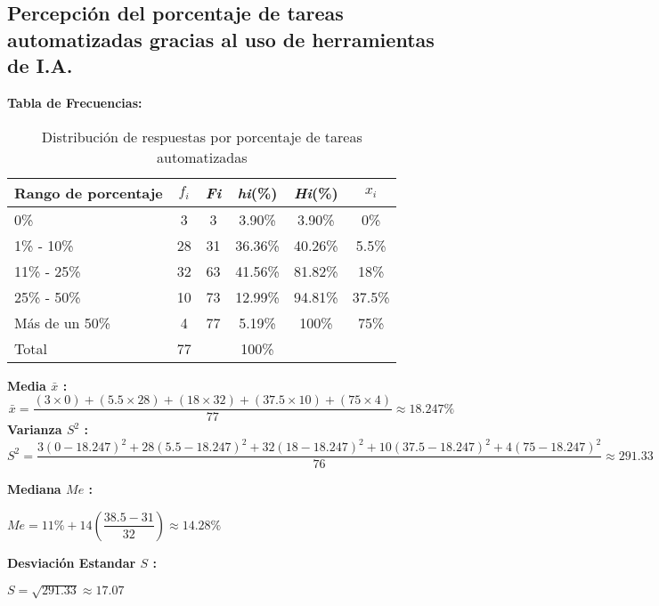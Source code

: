 \subsection{Percepción del porcentaje de tareas automatizadas gracias al uso de herramientas de I.A.}
\vspace{-0.5cm}
\textbf{Tabla de Frecuencias:}

\begin{table}[h!]
	\centering
	\renewcommand{\arraystretch}{1.2}
	\begin{tabular}{l c c c c c}
		\hline
		{Rango de porcentaje} & {\(f_i\)} & \textit{Fi} & \textit{hi}(\%) & \textit{Hi}(\%) & \(x_i\)\\
		\hline
		0\%                  & 3  & 3  & 3.90\%  & 3.90\% & 0\% \\
		1\% - 10\%           & 28 & 31 & 36.36\% & 40.26\% & 5.5\% \\
		11\% - 25\%          & 32 & 63 & 41.56\% & 81.82\% & 18\% \\
		25\% - 50\%          & 10 & 73 & 12.99\% & 94.81\% &37.5\% \\
		Más de un 50\%       & 4  & 77 & 5.19\%  & 100\% & 75\% \\
		\hline
		Total                & 77 &    & 100\%   & & \\
		\hline
	\end{tabular}
	\caption{Distribución de respuestas por porcentaje de tareas automatizadas}
	\label{tabla:porcentaje_IA}
\end{table}
\vspace{-0.5cm}
\textbf{Media $\bar{x}$ :}
\begin{equation*}
	\bar{x} = \dfrac{(3 \times 0) + (5.5 \times 28) + (18 \times 32) + (37.5 \times 10) + (75 \times 4)}{77} \approx 18.247\%
\end{equation*}
\textbf{Varianza $S^2$ :}
\begin{equation*}
	S^2 = \dfrac{3(0-18.247)^2 + 28(5.5-18.247)^2 + 32(18-18.247)^2 + 10(37.5 - 18.247)^2 + 4(75 - 18.247)^2}{76} \approx 291.33
\end{equation*}
\begin{multicols}{2}
	\textbf{Mediana $Me$ :}
	\vspace{-0.5cm}
	\begin{center}
		$Me = 11\% + 14(\dfrac{38.5 - 31}{32}) \approx 14.28\%$
	\end{center}
	\textbf{Desviación Estandar $S$ :}
	\vspace{-0.5cm}
	\begin{center}
		$S = \sqrt{291.33} \approx 17.07$
	\end{center}
\end{multicols}
